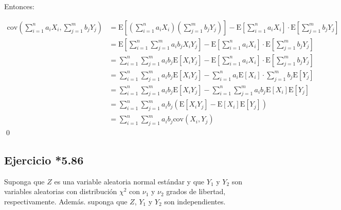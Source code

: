 \documentclass[8pt]{article}
\begin{document}
Entonces:

\begin{align*}
    \text{cov}\left(\sum_{i=1}^n a_i X_i, \sum_{j=1}^m b_j Y_j\right) &= \text{E}\left[\left(\sum_{i=1}^n a_i X_i\right)\left(\sum_{j=1}^m b_j Y_j\right)\right] - \text{E}\left[\sum_{i=1}^n a_i X_i\right]\cdot\text{E}\left[\sum_{j=1}^m b_j Y_j\right] \\
    &= \text{E}\left[\sum_{i=1}^n \sum_{j=1}^m a_i b_j X_i Y_j\right] - \text{E}\left[\sum_{i=1}^n a_i X_i\right]\cdot\text{E}\left[\sum_{j=1}^m b_j Y_j\right] \\
    &= \sum_{i=1}^n \sum_{j=1}^m a_i b_j \text{E}\left[X_i Y_j\right] - \text{E}\left[\sum_{i=1}^n a_i X_i\right]\cdot\text{E}\left[\sum_{j=1}^m b_j Y_j\right] \\
    &= \sum_{i=1}^n \sum_{j=1}^m a_i b_j \text{E}\left[X_i Y_j\right] - \sum_{i=1}^n a_i \text{E}\left[X_i\right]\cdot\sum_{j=1}^m b_j \text{E}\left[Y_j\right] \\
    &= \sum_{i=1}^n \sum_{j=1}^m a_i b_j \text{E}\left[X_i Y_j\right] - \sum_{i=1}^n \sum_{j=1}^m a_i b_j \text{E}\left[X_i\right]\text{E}\left[Y_j\right] \\
    &= \sum_{i=1}^n \sum_{j=1}^m a_i b_j \left(\text{E}\left[X_i Y_j\right] - \text{E}\left[X_i\right]\text{E}\left[Y_j\right]\right) \\
    &= \sum_{i=1}^n \sum_{j=1}^m a_i b_j \text{cov}\left(X_i, Y_j\right)
\end{align*}\qed

\subsection*{Ejercicio *5.86}

Suponga que $Z$ es una variable aleatoria normal estándar y que $Y_1$ y $Y_2$ son variables aleatorias con distribución $\chi^2$ con $\nu_1$ y $\nu_2$ grados de libertad, respectivamente. Además. suponga que $Z$, $Y_1$ y $Y_2$ son independientes.
\end{document}
